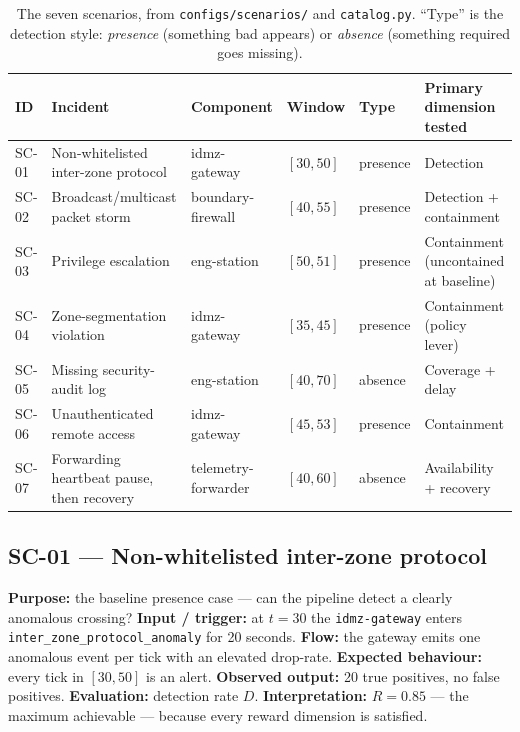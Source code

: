 \documentclass[11pt]{article}
\newcommand{\code}[1]{\texttt{\small #1}}
\newcommand{\file}[1]{\textcolor{mfpurple}{\texttt{\small #1}}}
\begin{document}
\begin{table}[h]
\centering
\caption{The seven scenarios, from \file{configs/scenarios/} and
\file{catalog.py}. ``Type'' is the detection style: \emph{presence} (something
bad appears) or \emph{absence} (something required goes missing).}
\label{tab:scenarios}
\scriptsize
\begin{tabular}{p{1.0cm} p{3.1cm} p{2.0cm} p{1.3cm} p{1.1cm} p{3.0cm}}
\toprule
\textbf{ID} & \textbf{Incident} & \textbf{Component} & \textbf{Window} & \textbf{Type} & \textbf{Primary dimension tested}\\
\midrule
SC-01 & Non-whitelisted inter-zone protocol & idmz-gateway & $[30,50]$ & presence & Detection\\
SC-02 & Broadcast/multicast packet storm & boundary-firewall & $[40,55]$ & presence & Detection + containment\\
SC-03 & Privilege escalation & eng-station & $[50,51]$ & presence & Containment (uncontained at baseline)\\
SC-04 & Zone-segmentation violation & idmz-gateway & $[35,45]$ & presence & Containment (policy lever)\\
SC-05 & Missing security-audit log & eng-station & $[40,70]$ & absence & Coverage + delay\\
SC-06 & Unauthenticated remote access & idmz-gateway & $[45,53]$ & presence & Containment\\
SC-07 & Forwarding heartbeat pause, then recovery & telemetry-forwarder & $[40,60]$ & absence & Availability + recovery\\
\bottomrule
\end{tabular}
\end{table}

\subsection{SC-01 --- Non-whitelisted inter-zone protocol}
\textbf{Purpose:} the baseline presence case --- can the pipeline detect a clearly
anomalous crossing? \textbf{Input / trigger:} at $t=30$ the \code{idmz-gateway}
enters \code{inter\_zone\_protocol\_anomaly} for 20 seconds. \textbf{Flow:} the
gateway emits one anomalous event per tick with an elevated drop-rate.
\textbf{Expected behaviour:} every tick in $[30,50]$ is an alert.
\textbf{Observed output:} 20 true positives, no false positives.
\textbf{Evaluation:} detection rate $D$. \textbf{Interpretation:} $R=0.85$ ---
the maximum achievable --- because every reward dimension is satisfied.
\end{document}
